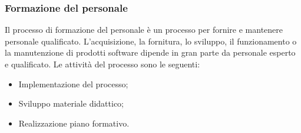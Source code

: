 \subsubsection{Formazione del personale}
Il processo di formazione del personale è un processo per fornire e mantenere personale qualificato. L'acquisizione, la fornitura, lo sviluppo, il funzionamento o la manutenzione di prodotti software dipende in gran parte da personale esperto e qualificato.
Le attività del processo sono le seguenti:
\begin{itemize}
\item Implementazione del processo;
\item Sviluppo materiale didattico;
\item Realizzazione piano formativo.
\end{itemize}